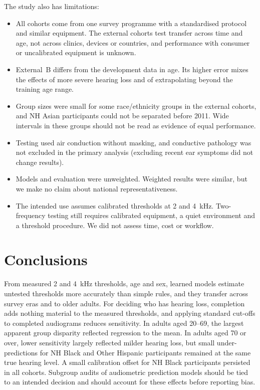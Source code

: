 \documentclass[11pt]{article}
\begin{document}
The study also has limitations:
\begin{itemize}
\item All cohorts come from one survey programme with a standardised protocol and similar equipment. The external cohorts test transfer across time and age, not across clinics, devices or countries, and performance with consumer or uncalibrated equipment is unknown.
\item External~B differs from the development data in age. Its higher error mixes the effects of more severe hearing loss and of extrapolating beyond the training age range.
\item Group sizes were small for some race/ethnicity groups in the external cohorts, and NH Asian participants could not be separated before 2011. Wide intervals in these groups should not be read as evidence of equal performance.
\item Testing used air conduction without masking, and conductive pathology was not excluded in the primary analysis (excluding recent ear symptoms did not change results).
\item Models and evaluation were unweighted. Weighted results were similar, but we make no claim about national representativeness.
\item The intended use assumes calibrated thresholds at 2 and 4~kHz. Two-frequency testing still requires calibrated equipment, a quiet environment and a threshold procedure. We did not assess time, cost or workflow.
\end{itemize}

\section*{Conclusions}
From measured 2 and 4~kHz thresholds, age and sex, learned models estimate untested thresholds more accurately than simple rules, and they transfer across survey eras and to older adults. For deciding who has hearing loss, completion adds nothing material to the measured thresholds, and applying standard cut-offs to completed audiograms reduces sensitivity. In adults aged 20--69, the largest apparent group disparity reflected regression to the mean. In adults aged 70 or over, lower sensitivity largely reflected milder hearing loss, but small under-predictions for NH Black and Other Hispanic participants remained at the same true hearing level. A small calibration offset for NH Black participants persisted in all cohorts. Subgroup audits of audiometric prediction models should be tied to an intended decision and should account for these effects before reporting bias.
\end{document}

